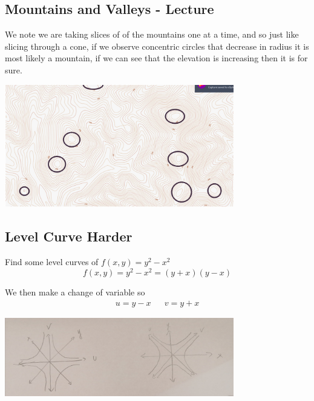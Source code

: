 \documentclass[11pt]{book}
\begin{document}
\subsection{Mountains and Valleys - Lecture}%
\label{sub:mountains_and_valleys_lecture}

We note we are taking slices of of the mountains one at a time, and so just like slicing through a cone, if we observe concentric circles that decrease in radius it is most likely a mountain, if we can see that the elevation is increasing then it is for sure.

\begin{center}
    \includegraphics[width=100mm]{assets/lec2_mount.png} 
\end{center}


\subsection{Level Curve Harder}%
\label{sub:level_curve_harder}

Find some level curves of $f\left(x,y\right) = y^2  - x^2 $ 
\[
    f\left(x,y\right) = y^2  - x^2 = \left( y + x \right) \left( y  - x \right) 
\]

We then make a change of variable so 
\begin{align*}
    u = y  - x && v= y + x
\end{align*}

\begin{center}
    \includegraphics[width=100mm]{assets/lec3-hyp.jpg} 
\end{center}
\end{document}
